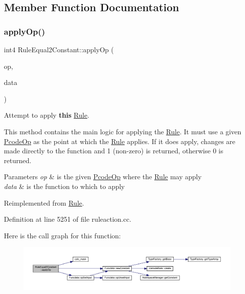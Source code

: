 \subsection{Member Function Documentation}
\mbox{\label{class_rule_equal2_constant_a99da234ae056794a853e6eb2466096e7}} 
\subsubsection{\texorpdfstring{applyOp()}{applyOp()}}
{\footnotesize\ttfamily int4 Rule\+Equal2\+Constant\+::apply\+Op (\begin{DoxyParamCaption}\item[{\mbox{\hyperlink{class_pcode_op}{Pcode\+Op}} $\ast$}]{op,  }\item[{\mbox{\hyperlink{class_funcdata}{Funcdata}} \&}]{data }\end{DoxyParamCaption})\hspace{0.3cm}{\ttfamily [virtual]}}



Attempt to apply {\bfseries{this}} \mbox{\hyperlink{class_rule}{Rule}}. 

This method contains the main logic for applying the \mbox{\hyperlink{class_rule}{Rule}}. It must use a given \mbox{\hyperlink{class_pcode_op}{Pcode\+Op}} as the point at which the \mbox{\hyperlink{class_rule}{Rule}} applies. If it does apply, changes are made directly to the function and 1 (non-\/zero) is returned, otherwise 0 is returned. 
\begin{DoxyParams}{Parameters}
{\em op} & is the given \mbox{\hyperlink{class_pcode_op}{Pcode\+Op}} where the \mbox{\hyperlink{class_rule}{Rule}} may apply \\
\hline
{\em data} & is the function to which to apply \\
\hline
\end{DoxyParams}


Reimplemented from \mbox{\hyperlink{class_rule_a4e3e61f066670175009f60fb9dc60848}{Rule}}.



Definition at line 5251 of file ruleaction.\+cc.

Here is the call graph for this function\+:
\nopagebreak
\begin{figure}[H]
\begin{center}
\leavevmode
\includegraphics[width=350pt]{class_rule_equal2_constant_a99da234ae056794a853e6eb2466096e7_cgraph}
\end{center}
\end{figure}
\mbox{\label{class_rule_equal2_constant_a69a9a14451113af78875906090e19929}} 
